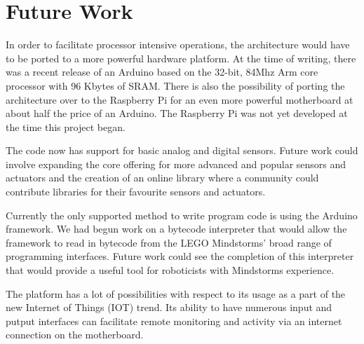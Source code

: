 \section{Future Work}
In order to facilitate processor intensive operations, the architecture would have to be ported to a more powerful hardware platform. At the time of writing, there was a recent release of an Arduino based on the 32-bit, 84Mhz Arm core processor with 96 Kbytes of SRAM. There is also the possibility of porting the architecture over to the Raspberry Pi for an even more powerful motherboard at about half the price of an Arduino. The Raspberry Pi was not yet developed at the time this project began.

The code now has support for basic analog and digital sensors. Future work could involve expanding the core offering for more advanced and popular sensors and actuators and the creation of an online library where a community could contribute libraries for their favourite sensors and actuators.

Currently the only supported method to write program code is using the Arduino framework. We had begun work on a bytecode interpreter that would allow the \xten framework to read in bytecode from the LEGO Mindstorms' broad range of programming interfaces. Future work could see the completion of this interpreter that would provide a useful tool for roboticists with Mindstorms experience.

The \xten platform has a lot of possibilities with respect to its usage as a part of the new Internet of Things (IOT) trend. Its ability to have numerous input and putput interfaces can facilitate remote monitoring and activity via an internet connection on the motherboard.